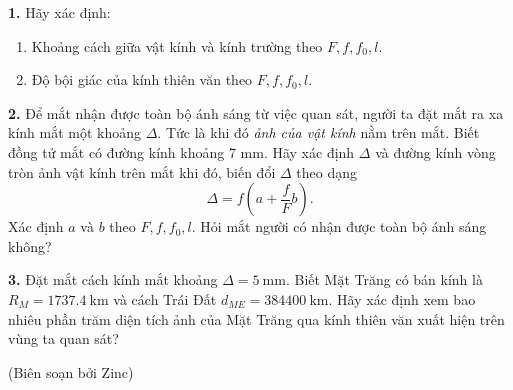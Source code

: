 \textbf{1.} Hãy xác định:
\begin{enumerate}[label=\textbf{\alph*,}]\itemsep0em
\item Khoảng cách giữa vật kính và kính trường theo $F, f, f_0, l$.
\item Độ bội giác của kính thiên văn theo $F, f, f_0, l$.
\end{enumerate}

\textbf{2.} Để mắt nhận được toàn bộ ánh sáng từ việc quan sát, người ta đặt mắt ra xa kính mắt một khoảng $\Delta$. Tức là khi đó \textit{ảnh của vật kính} nằm trên mắt. Biết đồng tử mắt có đường kính khoảng 7 mm. Hãy xác định $\Delta$ và đường kính vòng tròn ảnh vật kính trên mắt khi đó, biến đổi $\Delta$ theo dạng
$$\Delta = f\left(a + \frac{f}{F} b \right). $$
Xác định $a$ và $b$ theo $F, f, f_0, l$. Hỏi mắt người có nhận được toàn bộ ánh sáng không?

\vspace{1.5mm}

\textbf{3.} Đặt mắt cách kính mắt khoảng $\Delta = 5 \mathrm{~mm}$. Biết Mặt Trăng có bán kính là $R_M = 1737.4 \mathrm{~km}$ và cách Trái Đất $d_{ME} = 384400 \mathrm{~km}$. Hãy xác định xem bao nhiêu phần trăm diện tích ảnh của Mặt Trăng qua kính thiên văn xuất hiện trên vùng ta quan sát? %

\begin{flushright}
    (Biên soạn bởi Zinc)
\end{flushright}